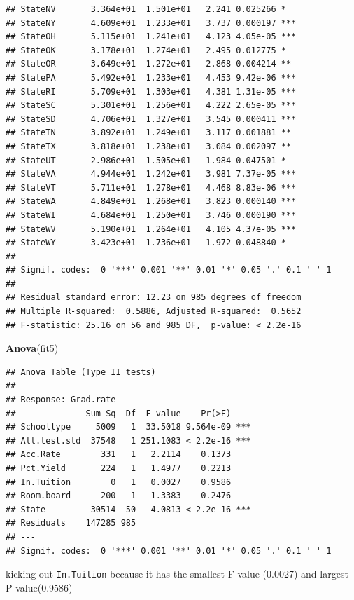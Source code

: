 \documentclass[]{article}
\newenvironment{Shaded}{\begin{snugshade}}{\end{snugshade}}
\newcommand{\KeywordTok}[1]{\textcolor[rgb]{0.13,0.29,0.53}{\textbf{#1}}}
\newcommand{\NormalTok}[1]{#1}
\begin{document}
\begin{verbatim}
## StateNV       3.364e+01  1.501e+01   2.241 0.025266 *  
## StateNY       4.609e+01  1.233e+01   3.737 0.000197 ***
## StateOH       5.115e+01  1.241e+01   4.123 4.05e-05 ***
## StateOK       3.178e+01  1.274e+01   2.495 0.012775 *  
## StateOR       3.649e+01  1.272e+01   2.868 0.004214 ** 
## StatePA       5.492e+01  1.233e+01   4.453 9.42e-06 ***
## StateRI       5.709e+01  1.303e+01   4.381 1.31e-05 ***
## StateSC       5.301e+01  1.256e+01   4.222 2.65e-05 ***
## StateSD       4.706e+01  1.327e+01   3.545 0.000411 ***
## StateTN       3.892e+01  1.249e+01   3.117 0.001881 ** 
## StateTX       3.818e+01  1.238e+01   3.084 0.002097 ** 
## StateUT       2.986e+01  1.505e+01   1.984 0.047501 *  
## StateVA       4.944e+01  1.242e+01   3.981 7.37e-05 ***
## StateVT       5.711e+01  1.278e+01   4.468 8.83e-06 ***
## StateWA       4.849e+01  1.268e+01   3.823 0.000140 ***
## StateWI       4.684e+01  1.250e+01   3.746 0.000190 ***
## StateWV       5.190e+01  1.264e+01   4.105 4.37e-05 ***
## StateWY       3.423e+01  1.736e+01   1.972 0.048840 *  
## ---
## Signif. codes:  0 '***' 0.001 '**' 0.01 '*' 0.05 '.' 0.1 ' ' 1
## 
## Residual standard error: 12.23 on 985 degrees of freedom
## Multiple R-squared:  0.5886, Adjusted R-squared:  0.5652 
## F-statistic: 25.16 on 56 and 985 DF,  p-value: < 2.2e-16
\end{verbatim}

\begin{Shaded}
\begin{Highlighting}[]
\KeywordTok{Anova}\NormalTok{(fit5)}
\end{Highlighting}
\end{Shaded}

\begin{verbatim}
## Anova Table (Type II tests)
## 
## Response: Grad.rate
##              Sum Sq  Df  F value    Pr(>F)    
## Schooltype     5009   1  33.5018 9.564e-09 ***
## All.test.std  37548   1 251.1083 < 2.2e-16 ***
## Acc.Rate        331   1   2.2114    0.1373    
## Pct.Yield       224   1   1.4977    0.2213    
## In.Tuition        0   1   0.0027    0.9586    
## Room.board      200   1   1.3383    0.2476    
## State         30514  50   4.0813 < 2.2e-16 ***
## Residuals    147285 985                       
## ---
## Signif. codes:  0 '***' 0.001 '**' 0.01 '*' 0.05 '.' 0.1 ' ' 1
\end{verbatim}

kicking out \texttt{In.Tuition} because it has the smallest F-value
(0.0027) and largest P value(0.9586)
\end{document}
